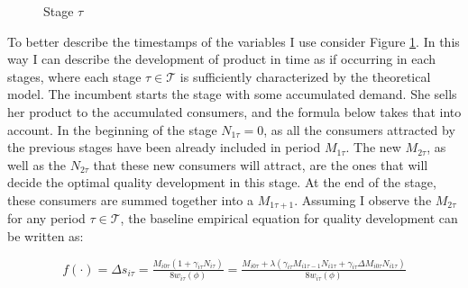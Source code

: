 \documentclass[13pt]{article}
\numberwithin{figure}{section}
\numberwithin{table}{section}
\theoremstyle{indented}
\numberwithin{equation}{section} %
\begin{document}
\begin{figure}

\centering
\caption{Stage $\tau$}
\label{fig:time}
\end{figure}


To better describe the timestamps of the variables I use consider Figure \ref{fig:time}. In this way I can describe the development of product in time as if occurring in each stages, where each stage $\tau \in \mathcal{T}$ is sufficiently characterized by the theoretical model. The incumbent starts the stage with some accumulated demand. She sells her product to the accumulated consumers, and the formula below takes that into account. In the beginning of the stage $N_{1\tau}=0$, as all the consumers attracted by the previous stages have been already included in period $M_{1\tau}$. The new $M_{2\tau}$, as well as the $N_{2\tau}$ that these new consumers will attract, are the ones that will decide the optimal quality development in this stage. At the end of the stage, these consumers are summed together into a $M_{1\tau+1}$. Assuming I observe the $M_{2\tau}$ for any period $\tau \in \mathcal{T}$, the baseline empirical equation for quality development can be written as:

\begin{equation}
f(\cdot) = \Delta s_{i\tau} = \tfrac{M_{i0\tau}(1+ \gamma_{i\tau} N_{i\tau})}{8w_{i\tau}(\phi)} = \tfrac{M_{i0\tau} +\lambda( \gamma_{i\tau} M_{i1\tau-1}N_{i1\tau} + \gamma_{i\tau}\Delta M_{i0\tau}N_{i1\tau})}{8w_{i\tau}(\phi)}
\end{equation}
\end{document}
